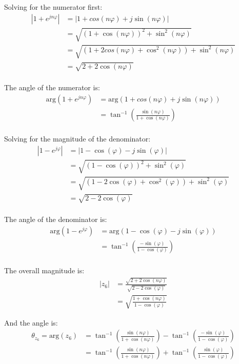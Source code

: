 \documentclass{article}
\begin{document}
\begin{enumerate}
\begin{itemize}
        Solving for the numerator first:
        \begin{align*}
            \left|1+e^{jn\varphi}\right| &= \left|1+cos(n\varphi)+j\sin(n\varphi)\right| \\
            &= \sqrt{(1+\cos(n\varphi))^2 + \sin^2(n\varphi)} \\
            &= \sqrt{(1+2cos(n\varphi)+\cos^2(n\varphi)) + \sin^2(n\varphi)} \\
            &= \sqrt{2+2\cos(n\varphi)} \\
        \end{align*}

        The angle of the numerator is:
        \begin{align*}
            \text{arg}(1+e^{jn\varphi}) &= \text{arg}(1+cos(n\varphi)+j\sin(n\varphi)) \\
            &= \tan^{-1}\left(\frac{\sin(n\varphi)}{1+\cos(n\varphi)}\right) \\
        \end{align*}

        Solving for the magnitude of the denominator:
        \begin{align*}
            \left|1-e^{j\varphi}\right| &= \left|1-\cos(\varphi)-j\sin(\varphi)\right| \\
            &= \sqrt{(1-\cos(\varphi))^2 + \sin^2(\varphi)} \\
            &= \sqrt{(1-2\cos(\varphi)+\cos^2(\varphi)) + \sin^2(\varphi)} \\
            &= \sqrt{2-2\cos(\varphi)} \\
        \end{align*}

        The angle of the denominator is:
        \begin{align*}
            \text{arg}(1-e^{j\varphi}) &= \text{arg}(1-\cos(\varphi)-j\sin(\varphi)) \\
            &= \tan^{-1}\left(\frac{-\sin(\varphi)}{1-\cos(\varphi)}\right) \\
        \end{align*}

        The overall magnitude is:
        \begin{align*}
            |z_6| &= \frac{\sqrt{2+2\cos(n\varphi)}}{\sqrt{2-2\cos(\varphi)}} \\
            &= \sqrt{\frac{1+\cos(n\varphi)}{1-\cos(\varphi)}}
        \end{align*}

        And the angle is:
        \begin{align*}
            \theta_{z_6} = \text{arg}(z_6) &= \tan^{-1}\left(\frac{\sin(n\varphi)}{1+\cos(n\varphi)}\right) - \tan^{-1}\left(\frac{-\sin(\varphi)}{1-\cos(\varphi)}\right) \\
            &= \tan^{-1}\left(\frac{\sin(n\varphi)}{1+\cos(n\varphi)}\right) + \tan^{-1}\left(\frac{\sin(\varphi)}{1-\cos(\varphi)}\right) 
        \end{align*}


\end{itemize}
\end{enumerate}
\end{document}
